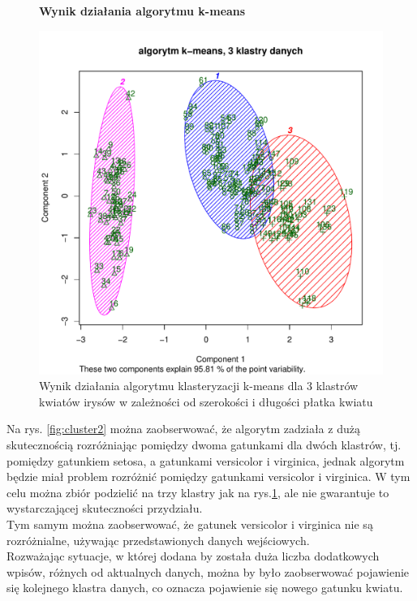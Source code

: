 \begin{figure}[h!]
    \centering
    \textbf{Wynik działania algorytmu k-means}\par\medskip
    \includegraphics[scale=0.4]{cluster3}
    \caption{Wynik działania algorytmu klasteryzacji k-means dla 3 klastrów kwiatów irysów w zależności od szerokości i 
długości płatka kwiatu}
    \label{fig:cluster3}
\end{figure}


Na rys. \ref{fig:cluster2} można zaobserwować, że algorytm zadziała z dużą skutecznością rozróżniając pomiędzy dwoma 
gatunkami dla dwóch klastrów, tj. pomiędzy gatunkiem setosa, a gatunkami versicolor i virginica, jednak algorytm będzie 
miał problem rozróżnić pomiędzy gatunkami versicolor i virginica.
W tym celu można zbiór podzielić na trzy klastry jak na rys.\ref{fig:cluster3}, ale nie gwarantuje to 
wystarczającej skuteczności przydziału. \\
Tym samym można zaobserwować, że gatunek versicolor i virginica nie są 
rozróżnialne, używając przedstawionych danych wejściowych.\\
Rozważając sytuacje, w której dodana by została duża liczba dodatkowych wpisów, różnych od aktualnych danych, 
można by było zaobserwować pojawienie się kolejnego klastra danych, co oznacza pojawienie się nowego gatunku kwiatu.


